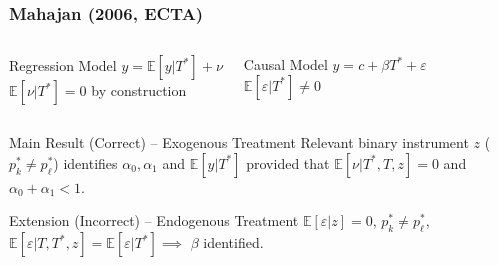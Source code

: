 \documentclass{beamer}
\begin{document}
\begin{frame}[label=MAHAJAN_APPEND]
  \frametitle{Mahajan (2006, ECTA)}

  \vspace{-1em}

    \begin{columns}[c]
    \begin{exampleblock}{Regression Model}
      $y = \mathbb{E}[y|T^*] + \nu$\\
      {\small $\mathbb{E}[\nu|T^*]=0$ by construction}
    \end{exampleblock}
    \begin{exampleblock}{Causal Model}
     $y = c + \beta T^* + \varepsilon$\\
     {\small$\mathbb{E}[\varepsilon|T^*]\neq 0$}
    \end{exampleblock}
    \end{columns}

    \vspace{1.5em}
  
  \begin{block}{Main Result (Correct) -- Exogenous Treatment}
   Relevant binary instrument $z$ ($p^*_k \neq p^*_\ell$) identifies $\alpha_0, \alpha_1$ and $\mathbb{E}[y|T^*]$ provided that $\mathbb{E}[\nu|T^*,T,z]=0$ and $\alpha_0 + \alpha_1 < 1$. 
  \end{block}

  \begin{alertblock}{Extension (Incorrect) -- Endogenous Treatment}
    $\mathbb{E}[\varepsilon|z]=0$, $p^*_k \neq p^*_\ell$, $\mathbb{E}[\varepsilon|T,T^*,z]=\mathbb{E}[\varepsilon|T^*] \implies$ $\beta$ identified.
  \end{alertblock}

\end{frame}

\end{document}
